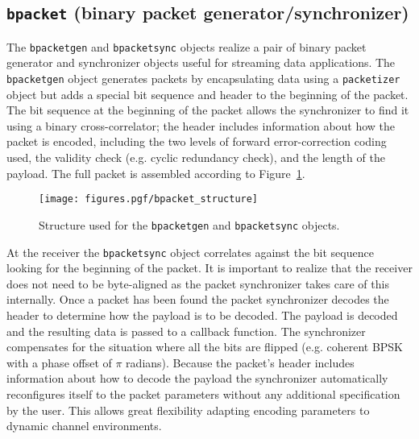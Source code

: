 %
%
\subsection{{\tt bpacket} (binary packet generator/synchronizer)}
\label{module:framing:bpacket}
The {\tt bpacketgen} and {\tt bpacketsync} objects realize a pair of
binary packet generator and synchronizer objects useful for streaming
data applications.
The {\tt bpacketgen} object generates packets by encapsulating data
using a {\tt packetizer} object but adds a special bit sequence and
header to the beginning of the packet.
The bit sequence at the beginning of the packet allows the synchronizer
to find it using a binary cross-correlator;
the header includes information about how the packet is encoded,
including the two levels of forward error-correction coding used, the
validity check (e.g. cyclic redundancy check), and the length of the
payload.
The full packet is assembled according to
Figure~\ref{fig:module:framing:bpacket_structure}.
% 
%
\begin{figure}
\centering
  \texttt{[image: figures.pgf/bpacket\_structure]}
\caption{
    Structure used for the {\tt bpacketgen} and
    {\tt bpacketsync} objects.}
\label{fig:module:framing:bpacket_structure}
\end{figure}


At the receiver
the {\tt bpacketsync} object correlates against the bit sequence looking
for the beginning of the packet.
It is important to realize that the receiver does not need to be
byte-aligned as the packet synchronizer takes care of this internally.
Once a packet has been found the packet synchronizer decodes the header
to determine how the payload is to be decoded.
The payload is decoded and the resulting data is passed to a callback
function.
The synchronizer compensates for the situation where all the bits are
flipped (e.g. coherent BPSK with a phase offset of $\pi$ radians).
Because the packet's header includes information about how to decode the
payload the synchronizer automatically reconfigures itself to the packet
parameters without any additional specification by the user.
This allows great flexibility adapting encoding parameters to dynamic
channel environments.


